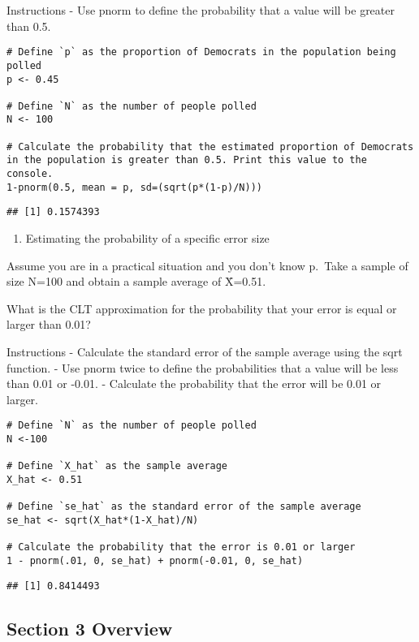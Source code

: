 \documentclass[
]{article}
\providecommand{\tightlist}{%
  \setlength{\itemsep}{0pt}\setlength{\parskip}{0pt}}
\begin{document}
Instructions - Use pnorm to define the probability that a value will be
greater than 0.5.

\begin{verbatim}
# Define `p` as the proportion of Democrats in the population being polled
p <- 0.45

# Define `N` as the number of people polled
N <- 100

# Calculate the probability that the estimated proportion of Democrats in the population is greater than 0.5. Print this value to the console.
1-pnorm(0.5, mean = p, sd=(sqrt(p*(1-p)/N)))
\end{verbatim}

\begin{verbatim}
## [1] 0.1574393
\end{verbatim}

\begin{enumerate}
\def\labelenumi{\arabic{enumi}.}
\setcounter{enumi}{12}
\tightlist
\item
  Estimating the probability of a specific error size
\end{enumerate}

Assume you are in a practical situation and you don't know p.~Take a
sample of size N=100 and obtain a sample average of X̄=0.51.

What is the CLT approximation for the probability that your error is
equal or larger than 0.01?

Instructions - Calculate the standard error of the sample average using
the sqrt function. - Use pnorm twice to define the probabilities that a
value will be less than 0.01 or -0.01. - Calculate the probability that
the error will be 0.01 or larger.

\begin{verbatim}
# Define `N` as the number of people polled
N <-100

# Define `X_hat` as the sample average
X_hat <- 0.51

# Define `se_hat` as the standard error of the sample average
se_hat <- sqrt(X_hat*(1-X_hat)/N)

# Calculate the probability that the error is 0.01 or larger
1 - pnorm(.01, 0, se_hat) + pnorm(-0.01, 0, se_hat)
\end{verbatim}

\begin{verbatim}
## [1] 0.8414493
\end{verbatim}

\hypertarget{section-3-overview}{%
\subsection{Section 3 Overview}\label{section-3-overview}}
\end{document}
